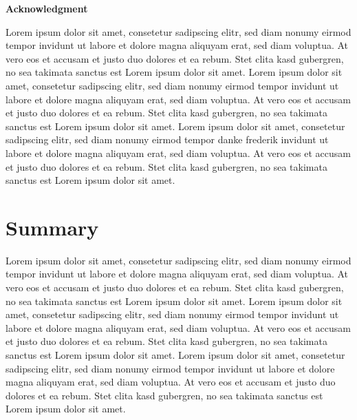 \documentclass[
  ,doc,11pt, twoside,floatsintext]{apa6}
\begin{document}
\clearpage

\mbox{}\thispagestyle{empty}\clearpage

\textbf{Acknowledgment}

\bigskip

Lorem ipsum dolor sit amet, consetetur sadipscing elitr, sed diam nonumy eirmod tempor invidunt ut labore et dolore magna aliquyam erat, sed diam voluptua. At vero eos et accusam et justo duo dolores et ea rebum. Stet clita kasd gubergren, no sea takimata sanctus est Lorem ipsum dolor sit amet. Lorem ipsum dolor sit amet, consetetur sadipscing elitr, sed diam nonumy eirmod tempor invidunt ut labore et dolore magna aliquyam erat, sed diam voluptua. At vero eos et accusam et justo duo dolores et ea rebum. Stet clita kasd gubergren, no sea takimata sanctus est Lorem ipsum dolor sit amet. Lorem ipsum dolor sit amet, consetetur sadipscing elitr, sed diam nonumy eirmod tempor danke frederik invidunt ut labore et dolore magna aliquyam erat, sed diam voluptua. At vero eos et accusam et justo duo dolores et ea rebum. Stet clita kasd gubergren, no sea takimata sanctus est Lorem ipsum dolor sit amet.

\clearpage

\mbox{}\thispagestyle{empty}\clearpage

\begin{flushleft}
{
\tableofcontents
}
\end{flushleft}

\newpage

\clearpage

\mbox{}\thispagestyle{empty}\clearpage

\thispagestyle{empty}

\hypertarget{summary}{%
\section{Summary}\label{summary}}

Lorem ipsum dolor sit amet, consetetur sadipscing elitr, sed diam nonumy eirmod tempor invidunt ut labore et dolore magna aliquyam erat, sed diam voluptua. At vero eos et accusam et justo duo dolores et ea rebum. Stet clita kasd gubergren, no sea takimata sanctus est Lorem ipsum dolor sit amet. Lorem ipsum dolor sit amet, consetetur sadipscing elitr, sed diam nonumy eirmod tempor invidunt ut labore et dolore magna aliquyam erat, sed diam voluptua. At vero eos et accusam et justo duo dolores et ea rebum. Stet clita kasd gubergren, no sea takimata sanctus est Lorem ipsum dolor sit amet. Lorem ipsum dolor sit amet, consetetur sadipscing elitr, sed diam nonumy eirmod tempor invidunt ut labore et dolore magna aliquyam erat, sed diam voluptua. At vero eos et accusam et justo duo dolores et ea rebum. Stet clita kasd gubergren, no sea takimata sanctus est Lorem ipsum dolor sit amet.
\end{document}
